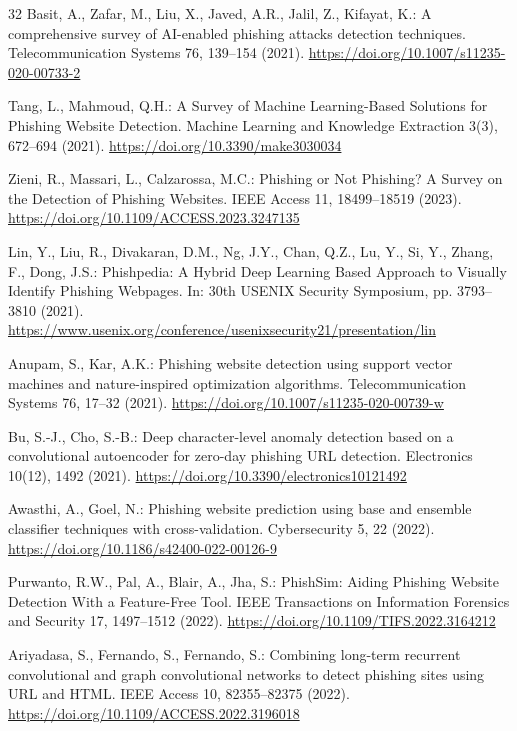 \documentclass[conference]{IEEEtran}
\begin{document}
\begin{thebibliography}{32}
Basit, A., Zafar, M., Liu, X., Javed, A.R., Jalil, Z., Kifayat, K.: A comprehensive survey of AI-enabled phishing attacks detection techniques. Telecommunication Systems 76, 139--154 (2021). \url{https://doi.org/10.1007/s11235-020-00733-2}

Tang, L., Mahmoud, Q.H.: A Survey of Machine Learning-Based Solutions for Phishing Website Detection. Machine Learning and Knowledge Extraction 3(3), 672--694 (2021). \url{https://doi.org/10.3390/make3030034}

Zieni, R., Massari, L., Calzarossa, M.C.: Phishing or Not Phishing? A Survey on the Detection of Phishing Websites. IEEE Access 11, 18499--18519 (2023). \url{https://doi.org/10.1109/ACCESS.2023.3247135}

Lin, Y., Liu, R., Divakaran, D.M., Ng, J.Y., Chan, Q.Z., Lu, Y., Si, Y., Zhang, F., Dong, J.S.: Phishpedia: A Hybrid Deep Learning Based Approach to Visually Identify Phishing Webpages. In: 30th USENIX Security Symposium, pp. 3793--3810 (2021). \url{https://www.usenix.org/conference/usenixsecurity21/presentation/lin}

Anupam, S., Kar, A.K.: Phishing website detection using support vector machines and nature-inspired optimization algorithms. Telecommunication Systems 76, 17--32 (2021). \url{https://doi.org/10.1007/s11235-020-00739-w}

Bu, S.-J., Cho, S.-B.: Deep character-level anomaly detection based on a convolutional autoencoder for zero-day phishing URL detection. Electronics 10(12), 1492 (2021). \url{https://doi.org/10.3390/electronics10121492}

Awasthi, A., Goel, N.: Phishing website prediction using base and ensemble classifier techniques with cross-validation. Cybersecurity 5, 22 (2022). \url{https://doi.org/10.1186/s42400-022-00126-9}

Purwanto, R.W., Pal, A., Blair, A., Jha, S.: PhishSim: Aiding Phishing Website Detection With a Feature-Free Tool. IEEE Transactions on Information Forensics and Security 17, 1497--1512 (2022). \url{https://doi.org/10.1109/TIFS.2022.3164212}

Ariyadasa, S., Fernando, S., Fernando, S.: Combining long-term recurrent convolutional and graph convolutional networks to detect phishing sites using URL and HTML. IEEE Access 10, 82355--82375 (2022). \url{https://doi.org/10.1109/ACCESS.2022.3196018}


\end{thebibliography}
\end{document}
